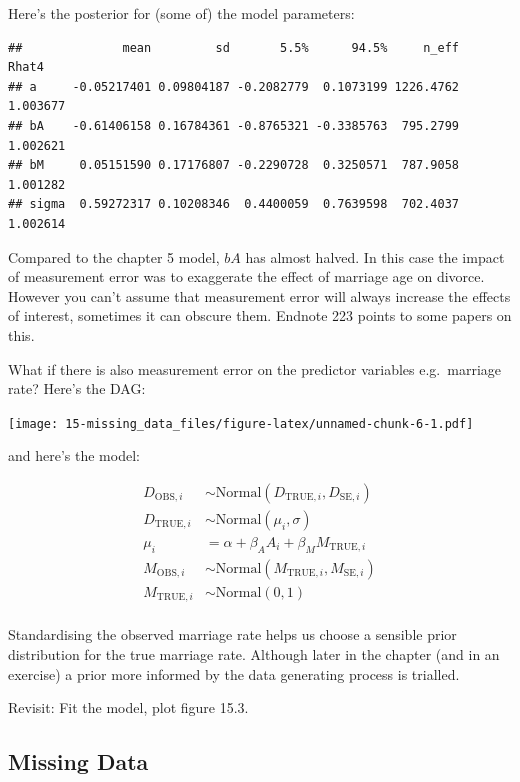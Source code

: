 \documentclass[
]{book}
\begin{document}
Here's the posterior for (some of) the model parameters:

\begin{verbatim}
##              mean         sd       5.5%      94.5%     n_eff    Rhat4
## a     -0.05217401 0.09804187 -0.2082779  0.1073199 1226.4762 1.003677
## bA    -0.61406158 0.16784361 -0.8765321 -0.3385763  795.2799 1.002621
## bM     0.05151590 0.17176807 -0.2290728  0.3250571  787.9058 1.001282
## sigma  0.59272317 0.10208346  0.4400059  0.7639598  702.4037 1.002614
\end{verbatim}

Compared to the chapter 5 model, \(bA\) has almost halved. In this case the impact of measurement error was to exaggerate the effect of marriage age on divorce. However you can't assume that measurement error will always increase the effects of interest, sometimes it can obscure them. Endnote 223 points to some papers on this.

What if there is also measurement error on the predictor variables e.g.~marriage rate? Here's the DAG:

\texttt{[image: 15-missing\_data\_files/figure-latex/unnamed-chunk-6-1.pdf]}

and here's the model:

\[
\begin{aligned}
D_{\text{OBS},i} &\sim \text{Normal}(D_{\text{TRUE},i},D_{\text{SE},i}) \\
D_{\text{TRUE},i} &\sim \text{Normal}(\mu_i,\sigma) \\
\mu_i &= \alpha + \beta_A A_i + \beta_M M_{\text{TRUE},i}\\
M_{\text{OBS},i} &\sim \text{Normal}(M_{\text{TRUE},i},M_{\text{SE},i}) \\
M_{\text{TRUE},i} &\sim \text{Normal}(0,1) \\
\end{aligned}
\]

Standardising the observed marriage rate helps us choose a sensible prior distribution for the true marriage rate. Although later in the chapter (and in an exercise) a prior more informed by the data generating process is trialled.

Revisit: Fit the model, plot figure 15.3.

\hypertarget{missing-data}{%
\subsection*{Missing Data}\label{missing-data}}
\end{document}
